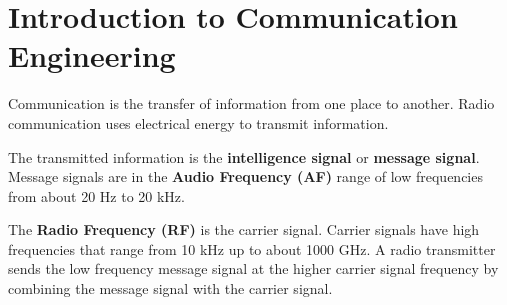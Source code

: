 \chapter [Introduction to Communication Engineering]{Introduction to Communication Engineering}


\cite{ACmanual}Communication is the transfer of information from one place to another. Radio communication uses electrical energy to transmit information. 

The transmitted information is the \textbf {intelligence signal} or \textbf{ message signal}.
 Message signals are in the \textbf {Audio Frequency (AF)} range of low frequencies from about 20 Hz to 20 kHz.
 
 
The \textbf{Radio Frequency (RF)}  is the carrier signal. Carrier signals have high frequencies that range from 10 kHz up to about 1000 GHz.
A radio transmitter sends the low frequency message signal at the higher carrier signal frequency by combining the message signal with the carrier signal.

